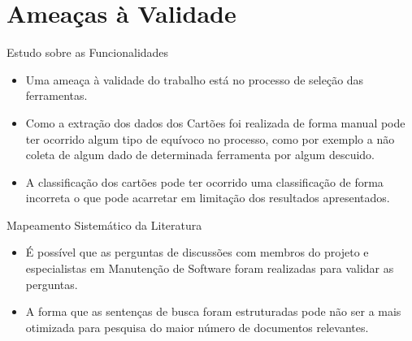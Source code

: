 \documentclass[t,14pt,mathserif]{beamer}
\begin{document}
\section{Ameaças à Validade}

\begin{frame}{Estudo sobre as Funcionalidades}
    \begin{itemize}

        \item Uma ameaça à validade do trabalho está no processo de seleção das
            ferramentas.

        \item Como a extração dos dados dos Cartões foi realizada de forma
            manual pode ter ocorrido algum tipo de equívoco no processo, como
            por exemplo a não coleta de algum dado de determinada ferramenta por
            algum descuido.

        \item A classificação dos cartões pode ter ocorrido uma classificação de
            forma incorreta o que pode acarretar em limitação dos resultados
            apresentados.
    \end{itemize}

\end{frame}

\begin{frame}{Mapeamento Sistemático da Literatura}
    \begin{itemize}

        \item É possível que as perguntas de discussões com membros do projeto e
              especialistas em Manutenção de Software foram realizadas para
              validar as perguntas.

        \item A forma que as sentenças de busca foram estruturadas pode não ser
              a mais otimizada para pesquisa do maior número de documentos
            relevantes.

    \end{itemize}
\end{frame}
\end{document}

